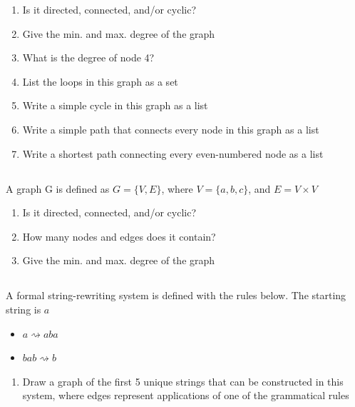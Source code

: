 \documentclass[twocolumn]{article}
\newcommand\mrk[1]{}
\begin{document}
    \begin{enumerate}
        \item Is it directed, connected, and/or cyclic? \mrk{1}
        \item Give the min. and max. degree of the graph \mrk{1}
        \item What is the degree of node 4? \mrk{1}
        \item List the loops in this graph as a set \mrk{1}
        \item Write a simple cycle in this graph as a list \mrk{1}
        \item Write a simple path that connects every node in this graph as a list \mrk{1}
        \item Write a shortest path connecting every even-numbered node as a list \mrk{1}
    \end{enumerate}


\subsection{}

    A graph G is defined as $G = \{V, E\}$, where $V = \{ a, b, c \}$, and $E = V \times V$

    \begin{enumerate}
        \item Is it directed, connected, and/or cyclic? \mrk{1}
        \item How many nodes and edges does it contain? \mrk{1}
        \item Give the min. and max. degree of the graph \mrk{1}
    \end{enumerate}

\subsection{}

    A formal string-rewriting system is defined with the rules below. The starting string is $a$
    
    \begin{itemize}
        \item $ a \rightsquigarrow aba $
        \item $bab \rightsquigarrow b$
    \end{itemize} 

    \begin{enumerate}
        \item Draw a graph of the first 5 unique strings that can be constructed in this system, where edges represent applications of one of the  grammatical rules \mrk{1}
    \end{enumerate}
\end{document}
